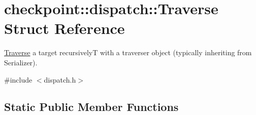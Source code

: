 \hypertarget{structcheckpoint_1_1dispatch_1_1_traverse}{}\section{checkpoint\+:\+:dispatch\+:\+:Traverse Struct Reference}
\label{structcheckpoint_1_1dispatch_1_1_traverse}


\hyperlink{structcheckpoint_1_1dispatch_1_1_traverse}{Traverse} a target recursively{\ttfamily T} with a traverser object (typically inheriting from {\ttfamily Serializer}).  




{\ttfamily \#include $<$dispatch.\+h$>$}

\subsection*{Static Public Member Functions}
